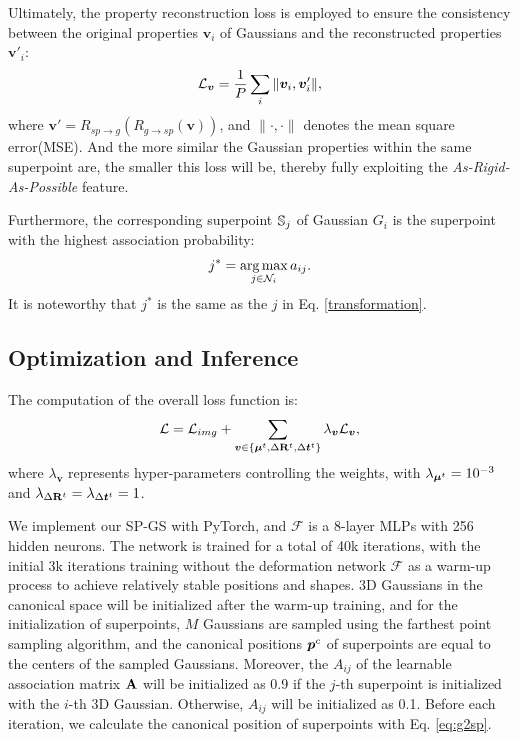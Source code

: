 Ultimately, the property reconstruction loss is employed to ensure the consistency between the original properties $\bm{v}_i$ of Gaussians and the reconstructed properties $\bm{v}'_i$:
\begin{equation} \label{eq:pr-loss}
     \mathcal{L}_{\bm{v}} = \frac{1}{P} \sum_{i}{\|\bm{v}_i, \bm{v}'_i\|},
 \end{equation}
 where $\bm{v}' = R_{sp\to g} (R_{g\to sp}(\bm{v}))$, and $\|\cdot, \cdot\|$ denotes the mean square error(MSE). And the more similar the Gaussian properties within the same superpoint are, the smaller this loss will be, thereby fully exploiting the \textit{As-Rigid-As-Possible} feature.


Furthermore, the corresponding superpoint $\mathbb{S}_j$ of Gaussian $G_i$ is the superpoint with the highest association probability:
\begin{equation}
    j^* = \operatorname*{\arg\max}_{j \in \mathcal{N}_i}a_{ij}.
\end{equation}
It is noteworthy that $j^*$ is the same as the $j$ in Eq. \ref{transformation}.
 
\subsection{Optimization and Inference} \label{sec:opt}
The computation of the overall loss function is:
\begin{equation}
    \mathcal{L} = \mathcal{L}_{img} + \sum_{\bm{v} \in \{\bm{\mu}^t, \Delta\mathbf{R}^t, \Delta\bm{t}^t\}} \lambda_{\bm{v}} \mathcal{L}_{\bm{v}},
\end{equation}
where $\lambda_{\bm{v}}$ represents hyper-parameters controlling the weights, with $\lambda_{\bm{\mu}^t} = 10^{-3}$ and $\lambda_{\Delta\mathbf{R}^t} = \lambda_{\Delta\bm{t}^t}=1$.

We implement our SP-GS with PyTorch, and $\mathcal{F}$ is a 8-layer MLPs with 256 hidden neurons. The network is trained for a total of 40k iterations, with the initial 3k iterations training without the deformation network $\mathcal{F}$ as a warm-up process to achieve relatively stable positions and shapes.
3D Gaussians in the canonical space will be initialized after the warm-up training, and for the initialization of superpoints, $M$ Gaussians are sampled using the farthest point sampling algorithm, and the canonical positions $\bm{p}^c$ of superpoints are equal to the centers of the sampled Gaussians.
Moreover, the $A_{ij}$ of the learnable association matrix $\mathbf{A}$ will be initialized as 0.9 if the $j$-th superpoint is initialized with the $i$-th 3D Gaussian. Otherwise, $A_{ij}$ will be initialized as 0.1.
Before each iteration, we calculate the canonical position of superpoints with Eq. \ref{eq:g2sp}.

